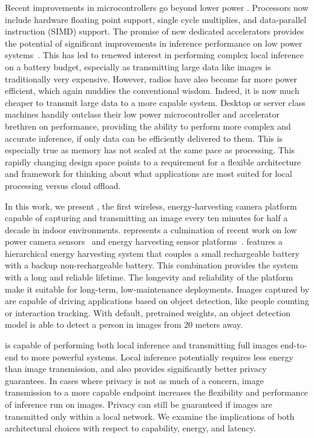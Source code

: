 Recent improvements in microcontrollers go beyond lower power \cite{kim2018system}. Processors now include hardware floating point support, single cycle multiplies, and data-parallel instruction (SIMD) support. The promise of new dedicated accelerators provides the potential of significant improvements in inference performance on low power systems~\cite{armm55,himaxwiseeye}. This has led to renewed interest in performing complex local inference on a battery budget, especially as transmitting large data like images is traditionally very expensive. However, radios have also become far more power efficient, which again muddies the conventional wisdom. Indeed, it is now much cheaper to transmit large data to a more capable system. Desktop or server class machines handily outclass their low power microcontroller and accelerator brethren on performance, providing the ability to perform more complex and accurate inference, if only data can be efficiently delivered to them.
This is especially true as memory has not scaled at the same pace as processing.
This rapidly changing design space points to a requirement for a flexible architecture and framework for thinking about what applications are most suited for local processing versus cloud offload.

In this work, we present \name, the first wireless, energy-harvesting camera platform capable of capturing and transmitting an image every ten minutes for half a decade in indoor environments.
\name represents a culmination of recent work on low power camera sensors~\cite{josephson2019wireless,nardello2019camaroptera,naderiparizi2015wispcam} and energy harvesting sensor platforms~\cite{jackson2019capacity}. \name features a hierarchical energy harvesting system that couples a small rechargeable battery with a backup non-rechargeable battery. This combination provides the system with a long and reliable lifetime. The longevity and reliability of the platform make it suitable for long-term, low-maintenance deployments. Images captured by \name are capable of driving applications based on object detection, like people counting or interaction tracking. With default, pretrained weights, an object detection model is able to detect a person in \name images from 20 meters away.

\name is capable of performing both local inference and transmitting full images end-to-end to more powerful systems. Local inference potentially requires less energy than image transmission, and also provides significantly better privacy guarantees. In cases where privacy is not as much of a concern, image transmission to a more capable endpoint increases the flexibility and performance of inference run on images. Privacy can still be guaranteed if images are transmitted only within a local network.
We examine the implications of both architectural choices with respect to capability, energy, and latency.

